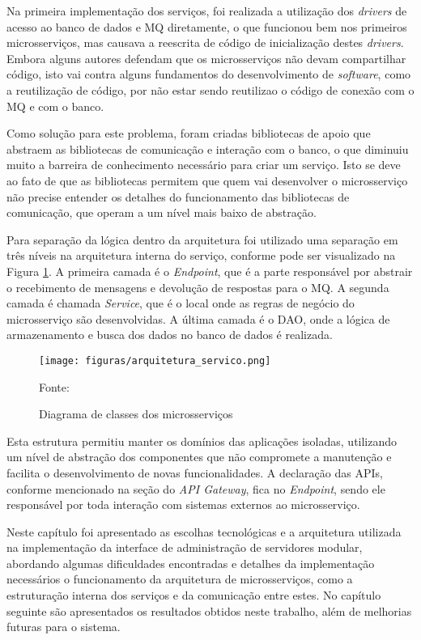 Na primeira implementação dos serviços, foi realizada a utilização dos
\emph{drivers} de acesso ao banco de dados e \ac{MQ} diretamente, o que
funcionou bem nos primeiros microsserviços, mas causava a reescrita de
código de inicialização destes \emph{drivers}. Embora alguns autores defendam
que os microsserviços não devam compartilhar código, isto vai contra alguns
fundamentos do desenvolvimento de \emph{software}, como a reutilização de
código, por não estar sendo reutilizao o código de conexão com o \ac{MQ}
e com o banco.

Como solução para este problema, foram criadas bibliotecas de apoio que
abstraem as bibliotecas de comunicação e interação com o banco, o que
diminuiu muito a barreira de conhecimento necessário para criar um serviço.
Isto se deve ao fato de que as bibliotecas permitem que quem vai desenvolver
o microsserviço não precise entender os detalhes do funcionamento das
bibliotecas de comunicação, que operam a um nível mais baixo de abstração.

Para separação da lógica dentro da arquitetura foi utilizado uma separação
em três níveis na arquitetura interna do serviço, conforme pode ser visualizado
na Figura \ref{fig:arch-servico}. A primeira camada é o \emph{Endpoint},
que é a parte responsável por abstrair o recebimento de mensagens e
devolução de respostas para o \ac{MQ}. A segunda camada é chamada
\emph{Service}, que é o local onde as regras de negócio do microsserviço
são desenvolvidas. A última camada é o \ac{DAO}, onde a lógica de armazenamento
e busca dos dados no banco de dados é realizada.

\begin{figure}[H]
	\centering
	\caption{Diagrama de classes dos microsserviços}
	\texttt{[image: figuras/arquitetura\_servico.png]}

	\label{fig:arch-servico}
	\footnotesize Fonte: \fonteOAutor
\end{figure}

Esta estrutura permitiu manter os domínios das aplicações isoladas,
utilizando um nível de abstração dos componentes que não compromete
a manutenção e facilita o desenvolvimento de novas funcionalidades.
A declaração das \acp{API}, conforme mencionado na seção do
\emph{API Gateway}, fica no \emph{Endpoint}, sendo ele responsável
por toda interação com sistemas externos ao microsserviço.

Neste capítulo foi apresentado as escolhas tecnológicas e a arquitetura
utilizada na implementação da interface de administração de servidores
modular, abordando algumas dificuldades encontradas e detalhes da
implementação necessários o funcionamento da arquitetura de microsserviços,
como a estruturação interna dos serviços e da comunicação entre estes.
No capítulo seguinte são apresentados os resultados obtidos neste
trabalho, além de melhorias futuras para o sistema.
